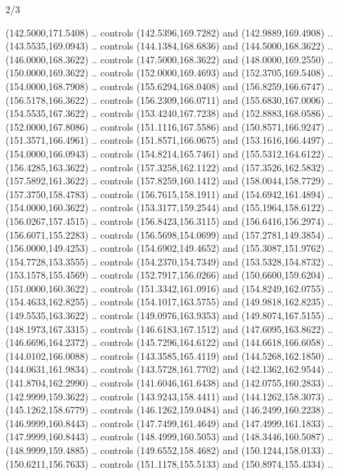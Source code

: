 \begin{flagdescription}{2/3}
\begin{scope}[shift={(0.5\flaglength,0.5)},scale=\flagwidth/320]
\begin{scope}[y=0.8pt, x=0.8pt, yscale=-1,shift={(-300,-200)}]
{\begin{scope}[line width=0.0011\flagwidth]
  (142.5000,171.5408) .. controls (142.5396,169.7282) and (142.9889,169.4908) ..
  (143.5535,169.0943) .. controls (144.1384,168.6836) and (144.5000,168.3622) ..
  (146.0000,168.3622) .. controls (147.5000,168.3622) and (148.0000,169.2550) ..
  (150.0000,169.3622) .. controls (152.0000,169.4693) and (152.3705,169.5408) ..
  (154.0000,168.7908) .. controls (155.6294,168.0408) and (156.8259,166.6747) ..
  (156.5178,166.3622) .. controls (156.2309,166.0711) and (155.6830,167.0006) ..
  (154.5535,167.3622) .. controls (153.4240,167.7238) and (152.8883,168.0586) ..
  (152.0000,167.8086) .. controls (151.1116,167.5586) and (150.8571,166.9247) ..
  (151.3571,166.4961) .. controls (151.8571,166.0675) and (153.1616,166.4497) ..
  (154.0000,166.0943) .. controls (154.8214,165.7461) and (155.5312,164.6122) ..
  (156.4285,163.3622) .. controls (157.3258,162.1122) and (157.3526,162.5832) ..
  (157.5892,161.3622) .. controls (157.8259,160.1412) and (158.0044,158.7729) ..
  (157.3750,158.4783) .. controls (156.7615,158.1911) and (154.6942,161.4894) ..
  (154.0000,160.3622) .. controls (153.3177,159.2544) and (155.1964,158.6122) ..
  (156.0267,157.4515) .. controls (156.8423,156.3115) and (156.6416,156.2974) ..
  (156.6071,155.2283) .. controls (156.5698,154.0699) and (157.2781,149.3854) ..
  (156.0000,149.4253) .. controls (154.6902,149.4652) and (155.3087,151.9762) ..
  (154.7728,153.3555) .. controls (154.2370,154.7349) and (153.5328,154.8732) ..
  (153.1578,155.4569) .. controls (152.7917,156.0266) and (150.6600,159.6204) ..
  (151.0000,160.3622) .. controls (151.3342,161.0916) and (154.8249,162.0755) ..
  (154.4633,162.8255) .. controls (154.1017,163.5755) and (149.9818,162.8235) ..
  (149.5535,163.3622) .. controls (149.0976,163.9353) and (149.8074,167.5155) ..
  (148.1973,167.3315) .. controls (146.6183,167.1512) and (147.6095,163.8622) ..
  (146.6696,164.2372) .. controls (145.7296,164.6122) and (144.6618,166.6058) ..
  (144.0102,166.0088) .. controls (143.3585,165.4119) and (144.5268,162.1850) ..
  (144.0631,161.9834) .. controls (143.5728,161.7702) and (142.1362,162.9544) ..
  (141.8704,162.2990) .. controls (141.6046,161.6438) and (142.0755,160.2833) ..
  (142.9999,159.3622) .. controls (143.9243,158.4411) and (144.1262,158.3073) ..
  (145.1262,158.6779) .. controls (146.1262,159.0484) and (146.2499,160.2238) ..
  (146.9999,160.8443) .. controls (147.7499,161.4649) and (147.4999,161.1833) ..
  (147.9999,160.8443) .. controls (148.4999,160.5053) and (148.3446,160.5087) ..
  (148.9999,159.4885) .. controls (149.6552,158.4682) and (150.1244,158.0133) ..
  (150.6211,156.7633) .. controls (151.1178,155.5133) and (150.8974,155.4334) ..

\end{scope}}
\end{scope}
\end{scope}
\end{flagdescription}

